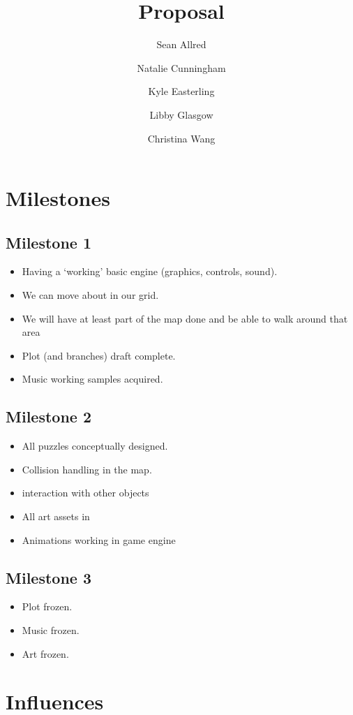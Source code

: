 \documentclass{article}
\title{Proposal}
\author{%
  Sean Allred \and
  Natalie Cunningham \and
  Kyle Easterling \and
  Libby Glasgow \and
  Christina Wang}
\begin{document}
\maketitle
\noindent

\section{Milestones}
\label{sec:milestones}

\subsection{Milestone 1}
\label{sec:milestone-1}
\begin{itemize}
\item Having a `working' basic engine
  (graphics, controls, sound).
\item We can move about in our grid.
\item We will have at least part of the map done
  and be able to walk around that area
\item Plot (and branches) draft complete.
\item Music working samples acquired.
\end{itemize}

\subsection{Milestone 2}
\label{sec:milestone-2}
\begin{itemize}
\item All puzzles conceptually designed.
\item Collision handling in the map.
\item interaction with other objects
\item All art assets in
\item Animations working in game engine
\end{itemize}

\subsection{Milestone 3}
\label{sec:milestone-3}
\begin{itemize}
\item Plot frozen.
\item Music frozen.
\item Art frozen.
\end{itemize}

\section{Influences}
\label{sec:influences}
\end{document}
